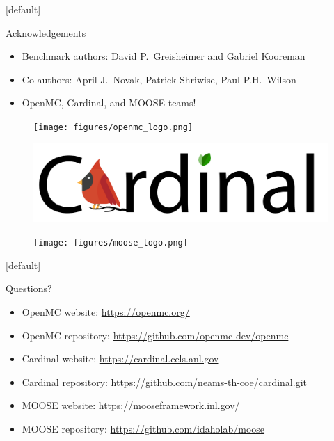 \documentclass[9pt,t]{beamer}
\makeatletter
\newenvironment{withoutheadline}{
       \setbeamertemplate{headline}[default]
       \def\beamer@entrycode{\vspace*{-\headheight}}
    }{}
\makeatother
\begin{document}
\begin{withoutheadline}
    \begin{frame}{Acknowledgements}
        \begin{itemize}
            \item Benchmark authors: David P.~Greisheimer and Gabriel Kooreman
            \item Co-authors: April J.~Novak, Patrick Shriwise, Paul P.H.~Wilson
            \item OpenMC, Cardinal, and MOOSE teams!
        \end{itemize}
        \begin{figure}[H]
            \centering
            \texttt{[image: figures/openmc\_logo.png]}
        \end{figure}
        \begin{figure}[H]
            \centering
            \includegraphics[width=0.75\linewidth]{figures/cardinal_logo.png}
        \end{figure}
        \begin{figure}[H]
            \centering
            \texttt{[image: figures/moose\_logo.png]}
        \end{figure}
    \end{frame}
\end{withoutheadline}

\begin{withoutheadline}
    \begin{frame}{Questions?}
        \begin{itemize}
            \item OpenMC website: \href{https://openmc.org/}{https://openmc.org/}
            \item OpenMC repository: \href{https://github.com/openmc-dev/openmc}{https://github.com/openmc-dev/openmc}
            \item Cardinal website: \href{https://cardinal.cels.anl.gov}{https://cardinal.cels.anl.gov}
            \item Cardinal repository: \href{https://github.com/neams-th-coe/cardinal.git}{https://github.com/neams-th-coe/cardinal.git}
            \item MOOSE website: \href{https://mooseframework.inl.gov/}{https://mooseframework.inl.gov/}
            \item MOOSE repository: \href{https://github.com/idaholab/moose}{https://github.com/idaholab/moose}
        \end{itemize}
    \end{frame}
\end{withoutheadline}
\end{document}
